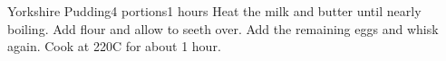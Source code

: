 \documentclass{article}
\begin{document}
\begin{recipe}{Yorkshire Pudding}{4 portions}{1 hours}
Heat the milk and butter until nearly boiling. Add flour and allow to
seeth over.
Add the remaining eggs and whisk again. Cook at 220\0C for about 1 hour.
\end{recipe}
\end{document}
